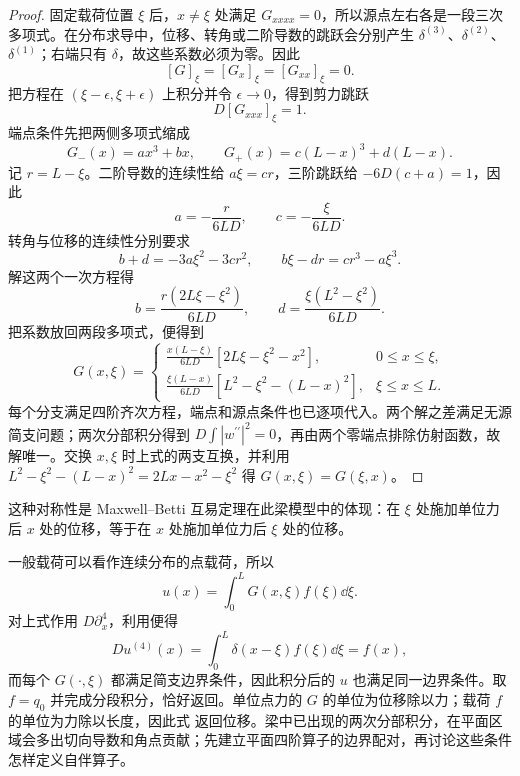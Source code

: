 \begin{proof}
固定载荷位置 \(\xi\) 后，\(x\ne\xi\) 处满足 \(G_{xxxx}=0\)，所以源点左右各是一段三次多项式。在分布求导中，位移、转角或二阶导数的跳跃会分别产生 $\delta^{(3)}$、$\delta^{(2)}$、$\delta^{(1)}$；右端只有 $\delta$，故这些系数必须为零。因此
\[
 [G]_{\xi}=[G_x]_{\xi}=[G_{xx}]_{\xi}=0.
\]
把方程在 \((\xi-\epsilon,\xi+\epsilon)\) 上积分并令 \(\epsilon\to0\)，得到剪力跳跃
\[
 D[G_{xxx}]_{\xi}=1.
\]
端点条件先把两侧多项式缩成
\[
 G_-(x)=a x^3+b x,\qquad
 G_+(x)=c(L-x)^3+d(L-x).
\]
记 $r=L-\xi$。二阶导数的连续性给 $a\xi=cr$，三阶跳跃给 $-6D(c+a)=1$，因此
\[
 a=-\frac{r}{6LD},\qquad c=-\frac{\xi}{6LD}.
\]
转角与位移的连续性分别要求
\[
 b+d=-3a\xi^2-3cr^2,\qquad
 b\xi-dr=cr^3-a\xi^3.
\]
解这两个一次方程得
\[
 b=\frac{r(2L\xi-\xi^2)}{6LD},\qquad
 d=\frac{\xi(L^2-\xi^2)}{6LD}.
\]
把系数放回两段多项式，便得到
\begin{equation}
G(x,\xi)=
\begin{cases}
\displaystyle
\frac{x(L-\xi)}{6LD}
\left[2L\xi-\xi^2-x^2\right],&0\le x\le\xi,\\[8pt]
\displaystyle
\frac{\xi(L-x)}{6LD}
\left[L^2-\xi^2-(L-x)^2\right],&\xi\le x\le L.
\end{cases}
\label{eq:phys-cont-beam-green-explicit}
\end{equation}
每个分支满足四阶齐次方程，端点和源点条件也已逐项代入。两个解之差满足无源简支问题；两次分部积分得到 $D\int|w^{\prime\prime}|^2=0$，再由两个零端点排除仿射函数，故解唯一。交换 $x,\xi$ 时上式的两支互换，并利用 $L^2-\xi^2-(L-x)^2=2Lx-x^2-\xi^2$ 得 $G(x,\xi)=G(\xi,x)$。
\end{proof}

这种对称性是 Maxwell--Betti 互易定理在此梁模型中的体现：在 \(\xi\) 处施加单位力后 \(x\) 处的位移，等于在 \(x\) 处施加单位力后 \(\xi\) 处的位移。

一般载荷可以看作连续分布的点载荷，所以
\begin{equation}
 u(x)=\int_0^L G(x,\xi)f(\xi)\dd\xi.
 \label{eq:phys-cont-beam-green-superposition}
\end{equation}
对上式作用 \(D\partial_x^4\)，利用便得
\[
 Du^{(4)}(x)=\int_0^L\delta(x-\xi)f(\xi)\dd\xi=f(x),
\]
而每个 \(G(\cdot,\xi)\) 都满足简支边界条件，因此积分后的 \(u\) 也满足同一边界条件。取 \(f=q_0\) 并完成分段积分，恰好返回。单位点力的 $G$ 的单位为位移除以力；载荷 $f$ 的单位为力除以长度，因此式 返回位移。梁中已出现的两次分部积分，在平面区域会多出切向导数和角点贡献；先建立平面四阶算子的边界配对，再讨论这些条件怎样定义自伴算子。

